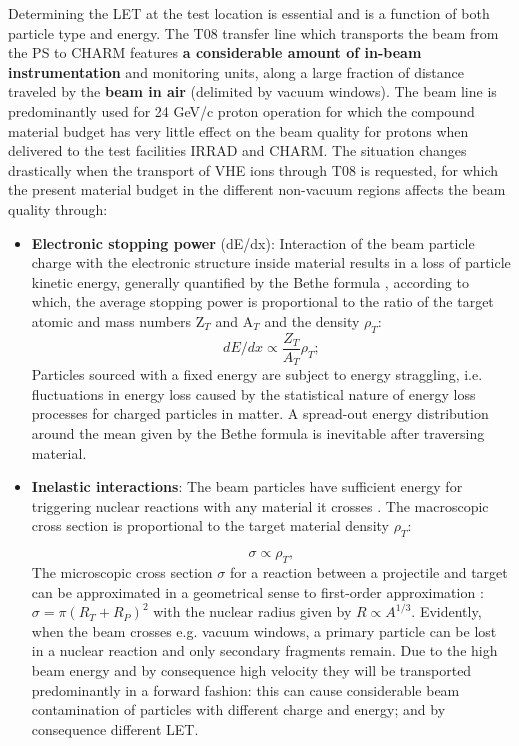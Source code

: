 Determining the LET at the test location is essential and is a function of both particle type and energy. The T08 transfer line which transports the beam from the PS to CHARM features \textbf{a considerable amount of in-beam instrumentation} and monitoring units, along a large fraction of distance traveled by the \textbf{beam in air} (delimited by vacuum windows). The beam line is predominantly used for 24 GeV/c proton operation for which the compound material budget has very little effect on the beam quality for protons when delivered to the test facilities IRRAD and CHARM. The situation changes drastically when the transport of VHE ions through T08 is requested, for which the present material budget in the different non-vacuum regions affects the beam quality through:
\begin{itemize}
    \item \textbf{Electronic stopping power} (dE/dx): Interaction of the beam particle charge with the electronic structure inside material results in a loss of particle kinetic energy, generally quantified by the Bethe formula \cite{Bethe30}, according to which, the average stopping power is proportional to the ratio of the target atomic and mass numbers Z$_T$ and A$_T$ and the density $\rho_T$:
\begin{equation}\label{stopping}
    dE/dx \propto \frac{Z_T}{A_T}\rho_T;
    \end{equation}
    Particles sourced with a fixed energy are subject to energy straggling, i.e. fluctuations in energy loss caused by the statistical nature of energy loss processes for charged particles in matter. A spread-out energy distribution around the mean given by the Bethe formula is inevitable after traversing material.
    \item \textbf{Inelastic interactions}: The beam particles have sufficient energy for triggering nuclear reactions with any material it crosses \cite{Lannunziata16}. The macroscopic cross section is proportional to the target material density $\rho_T$:

    \begin{equation}
    \sigma \propto \rho_T,
    \end{equation}
The microscopic cross section $\sigma$ for a reaction between a projectile and target can be approximated in a geometrical sense to first-order approximation \cite{Krane88}:  $\sigma = \pi (R_T + R_P)^2$   with the nuclear radius given by $R \propto A^{1/3}$.
    Evidently, when the beam crosses e.g. vacuum windows, a primary particle can be lost in a nuclear reaction and only secondary fragments remain. Due to the high beam energy and by consequence high velocity they will be transported predominantly in a forward fashion: this can cause considerable beam contamination of particles with different charge and energy; and by consequence different LET.
\end{itemize}

